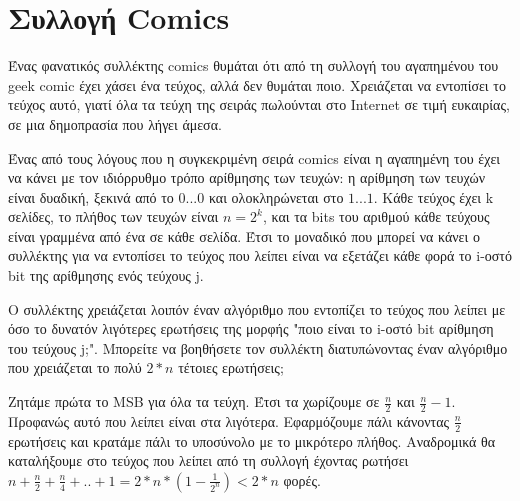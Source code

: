 \pagebreak
\section{Συλλογή Comics}
\begin{textit}
    Ένας φανατικός συλλέκτης comics θυμάται ότι από τη συλλογή του αγαπημένου
    του geek comic έχει χάσει ένα τεύχος, αλλά δεν θυμάται ποιο. Χρειάζεται να
    εντοπίσει το τεύχος αυτό, γιατί όλα τα τεύχη της σειράς πωλούνται στο
    Internet σε τιμή ευκαιρίας, σε μια δημοπρασία που λήγει άμεσα.
\end{textit}

\begin{textit}
    Ένας από τους λόγους που η συγκεκριμένη σειρά comics είναι η αγαπημένη του
    έχει να κάνει με τον ιδιόρρυθμο τρόπο αρίθμησης των τευχών: η αρίθμηση των
    τευχών είναι δυαδική, ξεκινά από το $0...0$ και ολοκληρώνεται στο $1...1$.
    Κάθε τεύχος έχει k σελίδες, το πλήθος των τευχών είναι $n=2^k$, και τα
    bits του αριθμού κάθε τεύχους είναι γραμμένα από ένα σε κάθε σελίδα. Έτσι
    το μοναδικό που μπορεί να κάνει ο συλλέκτης για να εντοπίσει το τεύχος που
    λείπει είναι να εξετάζει κάθε φορά το i-οστό bit της αρίθμησης ενός
    τεύχους j.
\end{textit}

\begin{textit}
    Ο συλλέκτης χρειάζεται λοιπόν έναν αλγόριθμο που εντοπίζει το τεύχος που
    λείπει με όσο το δυνατόν λιγότερες ερωτήσεις της μορφής "ποιο είναι το
    i-οστό bit αρίθμηση του τεύχους j;". Μπορείτε να βοηθήσετε τον συλλέκτη
    διατυπώνοντας έναν αλγόριθμο που χρειάζεται το πολύ $2*n$ τέτοιες
    ερωτήσεις;
\end{textit}
\vspace{0.4cm}

Ζητάμε πρώτα το MSB για όλα τα τεύχη. Έτσι τα χωρίζουμε σε $\frac{n}{2}$ και
$\frac{n}{2}-1$. Προφανώς αυτό που λείπει είναι στα λιγότερα. Εφαρμόζουμε πάλι
κάνοντας $\frac{n}{2}$ ερωτήσεις και κρατάμε πάλι το υποσύνολο με το μικρότερο
πλήθος. Αναδρομικά θα καταλήξουμε στο τεύχος που λείπει από τη συλλογή έχοντας
ρωτήσει $n+\frac{n}{2}+\frac{n}{4}+..+1=2*n*(1-\frac{1}{2^n}) < 2*n$ φορές.

